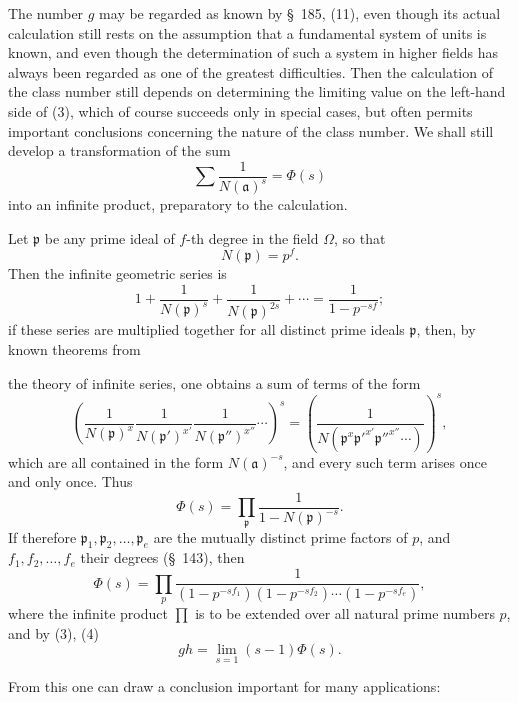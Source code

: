 \documentclass[11pt]{article}
\begin{document}
The number $g$ may be regarded as known by \S~185, (11), even though its actual calculation still rests on the assumption that a fundamental system of units is known, and even though the determination of such a system in higher fields has always been regarded as one of the greatest difficulties. Then the calculation of the class number still depends on determining the limiting value on the left-hand side of (3), which of course succeeds only in special cases, but often permits important conclusions concerning the nature of the class number. We shall still develop a transformation of the sum
\begin{equation}
\sum\frac1{N(\mathfrak a)^s}=\Phi(s)
\tag{4}
\end{equation}
into an infinite product, preparatory to the calculation.

Let $\mathfrak p$ be any prime ideal of $f$-th degree in the field $\Omega$, so that
\[
N(\mathfrak p)=p^f.
\]
Then the infinite geometric series is
\[
1+\frac1{N(\mathfrak p)^s}+\frac1{N(\mathfrak p)^{2s}}+\cdots
=\frac1{1-p^{-sf}};
\]
if these series are multiplied together for all distinct prime ideals $\mathfrak p$, then, by known theorems from

the theory of infinite series, one obtains a sum of terms of the form
\[
\left(\frac1{N(\mathfrak p)^x}\frac1{N(\mathfrak p')^{x'}}\frac1{N(\mathfrak p'')^{x''}}\cdots\right)^s
=\left(\frac1{N(\mathfrak p^x\mathfrak p'^{x'}\mathfrak p''^{x''}\cdots)}\right)^s,
\]
which are all contained in the form $N(\mathfrak a)^{-s}$, and every such term arises once and only once. Thus
\begin{equation}
\Phi(s)=\prod_{\mathfrak p}\frac1{1-N(\mathfrak p)^{-s}}.
\tag{5}
\end{equation}
If therefore $\mathfrak p_1,\mathfrak p_2,\ldots,\mathfrak p_e$ are the mutually distinct prime factors of $p$, and $f_1,f_2,\ldots,f_e$ their degrees (\S~143), then
\begin{equation}
\Phi(s)=\prod_p
\frac1{(1-p^{-sf_1})(1-p^{-sf_2})\cdots(1-p^{-sf_e})},
\tag{6}
\end{equation}
where the infinite product $\prod$ is to be extended over all natural prime numbers $p$, and by (3), (4)
\begin{equation}
gh=\lim_{s=1}(s-1)\Phi(s).
\tag{7}
\end{equation}

From this one can draw a conclusion important for many applications:
\end{document}
